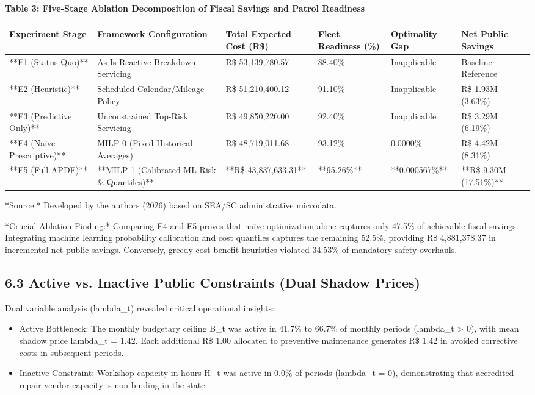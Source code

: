 \documentclass[10pt,a4paper,journal]{article}
\begin{document}
\paragraph{Table 3: Five-Stage Ablation Decomposition of Fiscal Savings and Patrol Readiness}
\begin{table}[htbp]
\centering
\small
\begin{tabular}{llllll}
\toprule
Experiment Stage & Framework Configuration & Total Expected Cost (R\$) & Fleet Readiness (\%) & Optimality Gap & Net Public Savings \\
\midrule
**E1 (Status Quo)** & As-Is Reactive Breakdown Servicing & R\$ 53,139,780.57 & 88.40\% & Inapplicable & Baseline Reference \\
**E2 (Heuristic)** & Scheduled Calendar/Mileage Policy & R\$ 51,210,400.12 & 91.10\% & Inapplicable & R\$ 1.93M (3.63\%) \\
**E3 (Predictive Only)** & Unconstrained Top-Risk Servicing & R\$ 49,850,220.00 & 92.40\% & Inapplicable & R\$ 3.29M (6.19\%) \\
**E4 (Naïve Prescriptive)** & MILP-0 (Fixed Historical Averages) & R\$ 48,719,011.68 & 93.12\% & 0.0000\% & R\$ 4.42M (8.31\%) \\
**E5 (Full APDF)** & **MILP-1 (Calibrated ML Risk \& Quantiles)** & **R\$ 43,837,633.31** & **95.26\%** & **0.000567\%** & **R\$ 9.30M (17.51\%)** \\
\bottomrule
\end{tabular}
\end{table}
*Source:* Developed by the authors (2026) based on SEA/SC administrative microdata.

*Crucial Ablation Finding:* Comparing E4 and E5 proves that naïve optimization alone captures only 47.5\% of achievable fiscal savings. Integrating machine learning probability calibration and cost quantiles captures the remaining 52.5\%, providing R\$ 4,881,378.37 in incremental net public savings. Conversely, greedy cost-benefit heuristics violated 34.53\% of mandatory safety overhauls.

\subsection{6.3 Active vs. Inactive Public Constraints (Dual Shadow Prices)}
Dual variable analysis (lambda\_t) revealed critical operational insights:

\begin{itemize}
\item Active Bottleneck: The monthly budgetary ceiling B\_t was active in 41.7\% to 66.7\% of monthly periods (lambda\_t > 0), with mean shadow price lambda\_t = 1.42. Each additional R\$ 1.00 allocated to preventive maintenance generates R\$ 1.42 in avoided corrective costs in subsequent periods.
\end{itemize}
\begin{itemize}
\item Inactive Constraint: Workshop capacity in hours H\_t was active in 0.0\% of periods (lambda\_t = 0), demonstrating that accredited repair vendor capacity is non-binding in the state.
\end{itemize}
\end{document}
